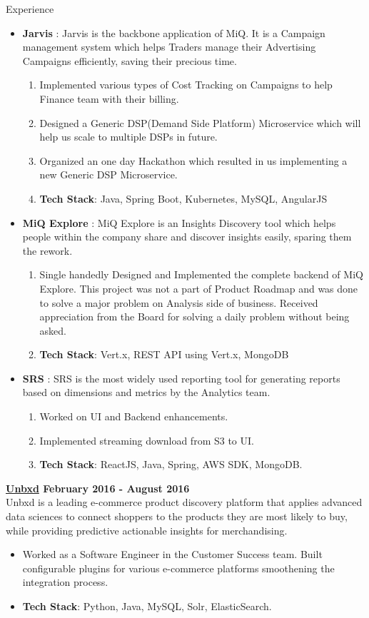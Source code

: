 \documentclass{resume} %
\begin{document}
\begin{rSection}{Experience}
\begin{itemize}
    \item {\bf{Jarvis}} : Jarvis is the backbone application of MiQ. It is a Campaign management system which helps Traders manage their Advertising Campaigns efficiently, saving their precious time. 
    \begin{enumerate}
        \item Implemented various types of Cost Tracking on Campaigns to help Finance team with their billing.
        \item Designed a Generic DSP(Demand Side Platform) Microservice which will help us scale to multiple DSPs in future.
        \item Organized an one day Hackathon which resulted in us implementing a new Generic DSP Microservice.
        \item {\bf{Tech Stack}}: Java, Spring Boot, Kubernetes, MySQL, AngularJS
    \end{enumerate}
    \item {\bf{MiQ Explore}} : MiQ Explore is an Insights Discovery tool which helps people within the company share and discover insights easily, sparing them the rework.
    \begin{enumerate}
        \item Single handedly Designed and Implemented the complete backend of MiQ Explore. This project was not a part of Product Roadmap and was done to solve a major problem on Analysis side of business. Received appreciation from the Board for solving a daily problem without being asked.
        \item {\bf{Tech Stack}}: Vert.x, REST API using Vert.x, MongoDB
    \end{enumerate}
    \item {\bf{SRS}} : SRS is the most widely used reporting tool for generating reports based on dimensions and metrics by the Analytics team.
    \begin{enumerate}
        \item Worked on UI and Backend enhancements.
        \item Implemented streaming download from S3 to UI.
        \item {\bf{Tech Stack}}: ReactJS, Java, Spring, AWS SDK, MongoDB. 
    \end{enumerate}
\end{itemize}


{\bf \href{https://unbxd.com}{Unbxd} \hfill{February 2016 - August 2016}}
\\Unbxd is a leading e-commerce product discovery platform that applies advanced data sciences to connect shoppers to the products they are most likely to buy, while providing predictive actionable insights for merchandising.
\begin{itemize}
    \item Worked as a Software Engineer in the Customer Success team. Built configurable plugins for various e-commerce platforms smoothening the integration process.
    \item {\bf{Tech Stack}}: Python, Java, MySQL, Solr, ElasticSearch. 
\end{itemize}


\end{rSection}
\end{document}
